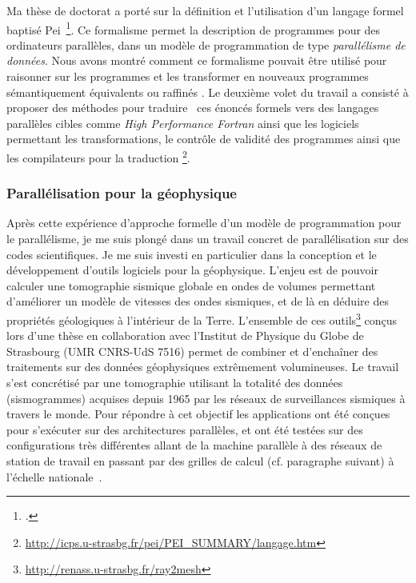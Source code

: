 \documentclass[11pt]{article}
\begin{document}
Ma thèse de doctorat \cite{icps-1997-4} a porté sur la définition et 
l'utilisation d'un langage formel baptis\'e Pei~\footcite{Violard92}. Ce 
formalisme permet la description de programmes pour des ordinateurs parallèles, 
dans un modèle de programmation de type \emph{parallélisme de données}. Nous 
avons montré comment ce formalisme pouvait être utilisé pour raisonner sur les 
programmes et les transformer en nouveaux programmes sémantiquement 
équivalents ou raffinés \cite{icps-1994-46,icps-1995-1,icps-1997-3,icps-1996-2}.
Le deuxième volet du travail a consisté à proposer des méthodes pour traduire~%
\cite{icps-1998-5} ces énoncés formels vers des langages parallèles cibles 
comme \textit{High Performance Fortran} ainsi que les logiciels permettant les 
transformations, le contrôle de validité des programmes ainsi que les 
compilateurs pour la traduction%
\footnote{\url{http://icps.u-strasbg.fr/pei/PEI_SUMMARY/langage.htm}}.


\subsubsection{Parallélisation pour la géophysique}

Après cette expérience d'approche formelle d'un modèle de programmation pour 
le parallélisme, je me suis plongé dans un travail concret de parallélisation 
sur des codes scientifiques. Je me suis investi en particulier dans la 
conception et le développement d'outils logiciels pour la géophysique. L'enjeu 
est de pouvoir calculer une tomographie sismique globale en ondes de volumes 
permettant d'améliorer un modèle de vitesses des ondes sismiques, et de là 
en déduire des propriétés géologiques à l'intérieur de la Terre. L'ensemble 
de ces outils\footnote{\url{http://renass.u-strasbg.fr/ray2mesh}} conçus lors 
d'une thèse en collaboration avec l'Institut de Physique du Globe de Strasbourg 
(UMR CNRS-UdS 7516) permet de combiner et d'enchaîner des traitements sur des 
données géophysiques extrêmement volumineuses. Le travail s'est concrétisé par 
une tomographie utilisant la totalité des données (sismogrammes) acquises 
depuis 1965 par les réseaux de surveillances sismiques à travers le monde. Pour 
répondre à cet objectif les applications ont été conçues pour s'exécuter sur 
des architectures parallèles, et ont été testées sur des configurations très 
différentes allant de la machine parallèle à des réseaux de station de travail 
en passant par des grilles de calcul (cf. paragraphe suivant) à l'échelle 
nationale~\cite{icps-2005-146,icps-2007-184}.  
\end{document}
